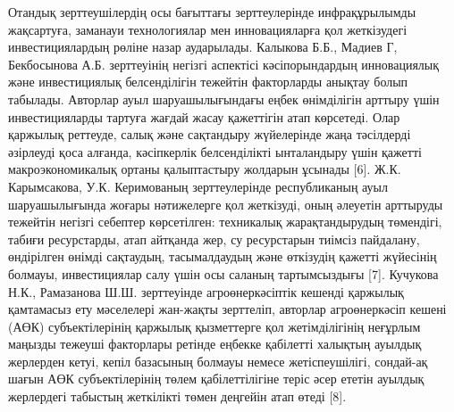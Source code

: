 {{Отандық зерттеушілердің осы бағыттағы зерттеулерінде инфрақұрылымды
жақсартуға, заманауи технологиялар мен инновацияларға қол жеткізудегі
инвестициялардың рөліне назар аударылады. Калыкова Б.Б., Мадиев Г,
Бекбосынова А.Б. зерттеуінің негізгі аспектісі кәсіпорындардың
инновациялық және инвестициялық белсенділігін тежейтін факторларды
анықтау болып табылады. Авторлар ауыл шаруашылығындағы еңбек өнімділігін
арттыру үшін инвестицияларды тартуға жағдай жасау қажеттігін атап
көрсетеді. Олар қаржылық реттеуде, салық және сақтандыру жүйелерінде
жаңа тәсілдерді әзірлеуді қоса алғанда, кәсіпкерлік белсенділікті
ынталандыру үшін қажетті макроэкономикалық ортаны қалыптастыру жолдарын
ұсынады {[}6{]}. Ж.К. Карымсакова, У.К. Керимованың зерттеулерінде
республиканың ауыл шаруашылығында жоғары нәтижелерге қол жеткізуді, оның
әлеуетін арттыруды тежейтін негізгі себептер көрсетілген: техникалық
жарақтандырудың төмендігі, табиғи ресурстарды, атап айтқанда жер, су
ресурстарын тиімсіз пайдалану, өндірілген өнімді сақтаудың,
тасымалдаудың және өткізудің қажетті жүйесінің болмауы, инвестициялар
салу үшін осы саланың тартымсыздығы {[}7{]}. Кучукова Н.К., Рамазанова
Ш.Ш. зерттеуінде агроөнеркәсіптік кешенді қаржылық қамтамасыз ету
мәселелері жан-жақты зерттеліп, авторлар агроөнеркәсіп кешені (АӨК)
субъектілерінің қаржылық қызметтерге қол жетімділігінің неғұрлым маңызды
тежеуші факторлары ретінде еңбекке қабілетті халықтың ауылдық жерлерден
кетуі, кепіл базасының болмауы немесе жетіспеушілігі, сондай-ақ шағын
АӨК субъектілерінің төлем қабілеттілігіне теріс әсер ететін ауылдық
жерлердегі табыстың жеткілікті төмен деңгейін атап өтеді {[}8{]}.

}}
